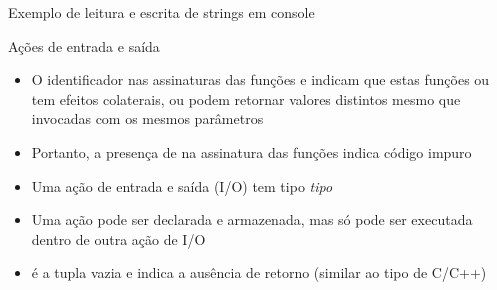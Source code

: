 \begin{frame}[fragile]{Exemplo de leitura e escrita de strings em console}
\end{frame}

\begin{frame}[fragile]{Ações de entrada e saída}

    \begin{itemize}
        \item O identificador  nas assinaturas das funções
             e  indicam que estas funções
            ou tem efeitos colaterais, ou podem retornar valores distintos mesmo que invocadas
            com os mesmos parâmetros

        \item Portanto, a presença de  na assinatura das funções indica 
            código impuro

        \item Uma ação de entrada e saída (I/O) tem tipo  \textit{tipo}

        \item Uma ação pode ser declarada e armazenada, mas só pode ser executada dentro de outra
            ação de I/O

        \item {} é a tupla vazia e indica a ausência de retorno (similar ao tipo
             de C/C++)

    \end{itemize}

\end{frame}

